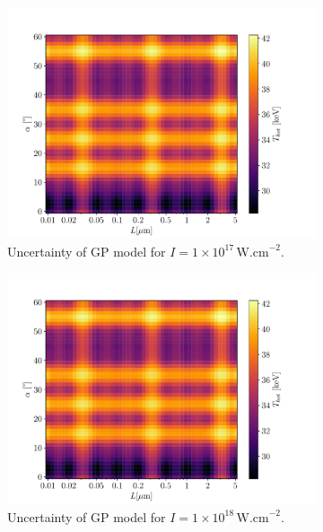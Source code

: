 \begin{figure}[ht]
	\centering
	\begin{subfigure}{0.49\textwidth}
		\centering
		\includegraphics[width=\textwidth]{figures/gp17_pred_ss}
		\caption{Uncertainty of GP model for $I = 1 \times 10^{17} \, \mathrm{W.cm}^{-2}$.}
		\label{fig:gp-pred-ss-a}
	\end{subfigure}
	\hfill
	\begin{subfigure}{0.49\textwidth}
		\centering
		\includegraphics[width=\textwidth]{figures/gp18_pred_ss}
		\caption{Uncertainty of GP model for $I = 1 \times 10^{18} \, \mathrm{W.cm}^{-2}$.}
		\label{fig:gp-pred-ss-b}
	\end{subfigure}
	\begin{subfigure}{0.49\textwidth}

\end{subfigure}
\end{figure}
